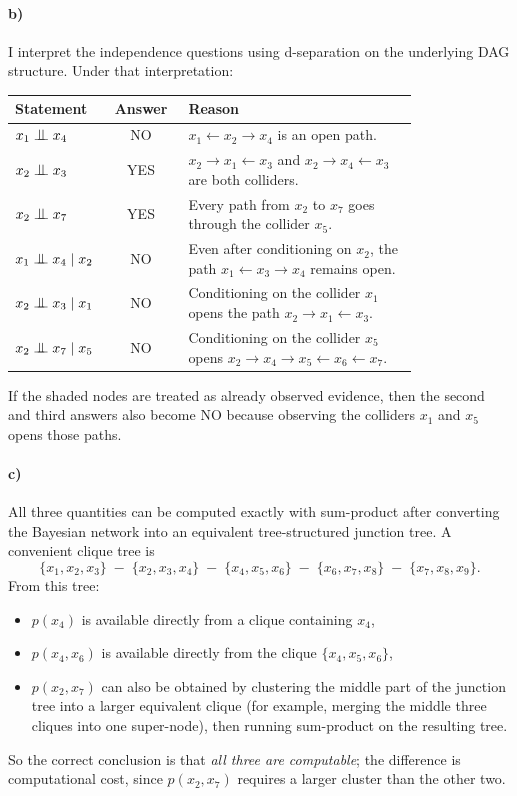\documentclass{article}
\begin{document}
\paragraph{b)} I interpret the independence questions using d-separation on the underlying DAG structure. Under that interpretation:
\begin{center}
\small
\renewcommand{\arraystretch}{1.25}
\begin{tabular}{|p{0.22\linewidth}|c|p{0.58\linewidth}|}
\hline
\textbf{Statement} & \textbf{Answer} & \textbf{Reason} \\
\hline
\(x_1 \bigCI x_4\) & NO & \(x_1 \leftarrow x_2 \rightarrow x_4\) is an open path. \\
\hline
\(x_2 \bigCI x_3\) & YES & \(x_2 \rightarrow x_1 \leftarrow x_3\) and \(x_2 \rightarrow x_4 \leftarrow x_3\) are both colliders. \\
\hline
\(x_2 \bigCI x_7\) & YES & Every path from \(x_2\) to \(x_7\) goes through the collider \(x_5\). \\
\hline
\(x_1 \bigCI x_4 \mid x_2\) & NO & Even after conditioning on \(x_2\), the path \(x_1 \leftarrow x_3 \rightarrow x_4\) remains open. \\
\hline
\(x_2 \bigCI x_3 \mid x_1\) & NO & Conditioning on the collider \(x_1\) opens the path \(x_2 \rightarrow x_1 \leftarrow x_3\). \\
\hline
\(x_2 \bigCI x_7 \mid x_5\) & NO & Conditioning on the collider \(x_5\) opens \(x_2 \rightarrow x_4 \rightarrow x_5 \leftarrow x_6 \leftarrow x_7\). \\
\hline
\end{tabular}
\end{center}
If the shaded nodes are treated as already observed evidence, then the second and third answers also become NO because observing the colliders $x_1$ and $x_5$ opens those paths.

\paragraph{c)} All three quantities can be computed exactly with sum-product after converting the Bayesian network into an equivalent tree-structured junction tree. A convenient clique tree is
\[
\{x_1,x_2,x_3\}
\;-\;
\{x_2,x_3,x_4\}
\;-\;
\{x_4,x_5,x_6\}
\;-\;
\{x_6,x_7,x_8\}
\;-\;
\{x_7,x_8,x_9\}.
\]
From this tree:
\begin{itemize}
    \item $p(x_4)$ is available directly from a clique containing $x_4$,
    \item $p(x_4,x_6)$ is available directly from the clique $\{x_4,x_5,x_6\}$,
    \item $p(x_2,x_7)$ can also be obtained by clustering the middle part of the junction tree into a larger equivalent clique (for example, merging the middle three cliques into one super-node), then running sum-product on the resulting tree.
\end{itemize}
So the correct conclusion is that \emph{all three are computable}; the difference is computational cost, since $p(x_2,x_7)$ requires a larger cluster than the other two.
\end{document}

